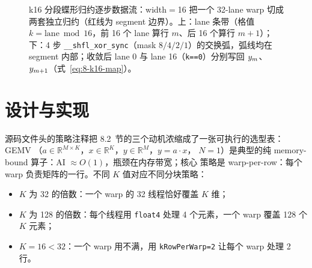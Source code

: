 \begin{figure}[H]
\caption{k16 分段蝶形归约逐步数据流：width$=$16 把一个 32-lane warp 切成两套独立归约（红线为 segment 边界）。上：lane 条带（格值 $k=\mathrm{lane}\bmod 16$，前 16 个 lane 算行 $m$、后 16 个算行 $m{+}1$）；下：4 步 \texttt{\_\_shfl\_xor\_sync}（mask $8/4/2/1$）的交换弧，弧线均在 segment 内部；收敛后 lane 0 与 lane 16（\texttt{k==0}）分别写回 $y\sb{m}$、$y\sb{m+1}$（式~\ref{eq:8-k16-map}）。}
\label{fig:08-k16-butterfly}
\end{figure}

\section{设计与实现}

源码文件头的策略注释把 8.2~节的三个动机浓缩成了一张可执行的选型表：GEMV
（$a \in \mathbb{R}^{M \times K}$，$x \in \mathbb{R}^{K}$，$y \in \mathbb{R}^{M}$，$y = a \cdot x$，
$N = 1$）是典型的纯 memory-bound 算子：AI $\approx O(1)$，瓶颈在内存带宽；核心
策略是 warp-per-row：每个 warp 负责矩阵的一行。不同 $K$ 值对应不同分块策略：

\begin{itemize}
  \item $K$ 为 32 的倍数：一个 warp 的 32 线程恰好覆盖 $K$ 维；
  \item $K$ 为 128 的倍数：每个线程用 \texttt{float4} 处理 4 个元素，一个 warp
        覆盖 128 个 $K$ 元素；
  \item $K = 16 < 32$：一个 warp 用不满，用
        \texttt{k\allowbreak{}Row\allowbreak{}Per\allowbreak{}Warp=\allowbreak{}2} 让每个 warp 处理 2 行。
\end{itemize}

